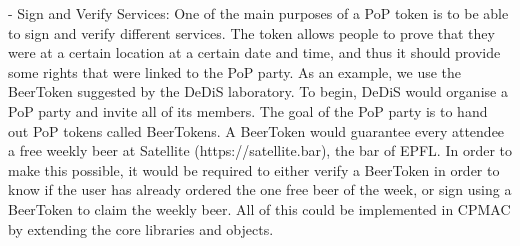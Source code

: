- Sign and Verify Services:
  One of the main purposes of a PoP token is to be able to sign and verify different services. The token allows people to prove that they were at a certain location at a certain date and time, and thus it should provide some rights that were linked to the PoP party. As an example, we use the BeerToken suggested by the DeDiS laboratory. To begin, DeDiS would organise a PoP party and invite all of its members. The goal of the PoP party is to hand out PoP tokens called BeerTokens. A BeerToken would guarantee every attendee a free weekly beer at Satellite (https://satellite.bar), the bar of EPFL. In order to make this possible, it would be required to either verify a BeerToken in order to know if the user has already ordered the one free beer of the week, or sign using a BeerToken to claim the weekly beer. All of this could be implemented in CPMAC by extending the core libraries and objects.
  